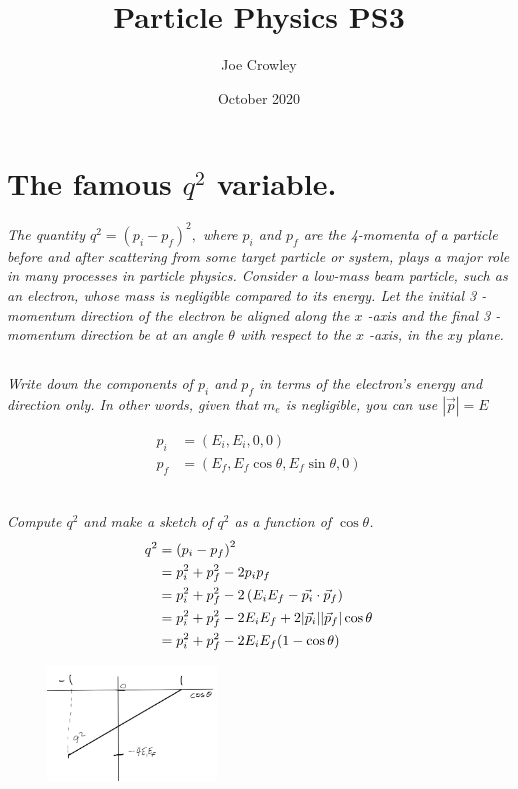 \documentclass{article}
\title{Particle Physics PS3}
\author{Joe Crowley}
\date{October 2020}
\begin{document}
  



\section{The famous $q^{2}$ variable.}
\textit{The quantity $q^{2}=\left(p_{i}-p_{f}\right)^{2},$ where $p_{i}$ and $p_{f}$ are the 4-momenta of a particle before and after scattering from some target particle or system, plays a major role in many processes in particle physics. Consider a low-mass beam particle, such as an electron, whose mass is negligible compared to its energy. Let the initial 3 -momentum direction of the electron be aligned along the $x$ -axis and the final 3 -momentum direction be at an angle $\theta$ with respect to the $x$ -axis, in the $x y$ plane.}

\subsection{}
\textit{Write down the components of $p_{i}$ and $p_{f}$ in terms of the electron's energy and direction only. In other words, given that $m_{e}$ is negligible, you can use $|\vec{p}|=E$}

\begin{align*}
    p_i &= (E_i, E_i,0,0)\\
    p_f &= (E_f, E_f \cos{\theta},E_f \sin{\theta},0)\\
\end{align*}




\subsection{}
\textit{Compute $q^{2}$ and make a sketch of $q^{2}$ as a function of $\cos \theta$.}
\begin{align*}
    q^{2}&=\left(p_{i}-p_{f}\right)^{2}\\
    &=p_{i}^{2}+p_{f}^{2}-2 p_i p_{f}\\
    &=p_{i}^{2}+p_{f}^{2}-2\left(E_{i} E_{f}-\vec{p_i} \cdot \vec{p}_{f}\right)\\
    &=p_{i}^{2}+p_{f}^{2}-2 E_{i} E_{f}+2\abs{\vec{p}_{i}} \abs{\vec{p}_{f}}  \cos \theta\\
    &=p_{i}^{2}+p_{f}^{2}-2 E_{i} E_{f}(1-\cos \theta)
\end{align*}
\begin{figure}[H]
    \centering
    \includegraphics[width=0.4\textwidth]{figures/problem1.png}
    \label{fig:my_label}
\end{figure}
\end{document}
